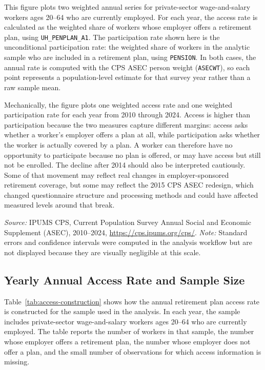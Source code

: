 \documentclass[11pt]{article}
\begin{document}
\noindent This figure plots two weighted annual series for private-sector wage-and-salary workers ages 20--64 who are currently employed. For each year, the access rate is calculated as the weighted share of workers whose employer offers a retirement plan, using \texttt{UH\_PENPLAN\_A1}. The participation rate shown here is the unconditional participation rate: the weighted share of workers in the analytic sample who are included in a retirement plan, using \texttt{PENSION}. In both cases, the annual rate is computed with the CPS ASEC person weight (\texttt{ASECWT}), so each point represents a population-level estimate for that survey year rather than a raw sample mean.

\noindent Mechanically, the figure plots one weighted access rate and one weighted participation rate for each year from 2010 through 2024. Access is higher than participation because the two measures capture different margins: access asks whether a worker's employer offers a plan at all, while participation asks whether the worker is actually covered by a plan. A worker can therefore have no opportunity to participate because no plan is offered, or may have access but still not be enrolled. The decline after 2014 should also be interpreted cautiously. Some of that movement may reflect real changes in employer-sponsored retirement coverage, but some may reflect the 2015 CPS ASEC redesign, which changed questionnaire structure and processing methods and could have affected measured levels around that break.

\noindent \textit{Source:} IPUMS CPS, Current Population Survey Annual Social and Economic Supplement (ASEC), 2010--2024, \url{https://cps.ipums.org/cps/}. \textit{Note:} Standard errors and confidence intervals were computed in the analysis workflow but are not displayed because they are visually negligible at this scale.




\clearpage
\subsection{Yearly Annual Access Rate and Sample Size}

Table~\ref{tab:access-construction} shows how the annual retirement plan access rate is constructed for the sample used in the analysis. In each year, the sample includes private-sector wage-and-salary workers ages 20--64 who are currently employed. The table reports the number of workers in that sample, the number whose employer offers a retirement plan, the number whose employer does not offer a plan, and the small number of observations for which access information is missing.
\end{document}

